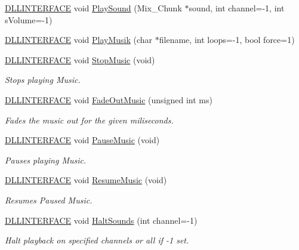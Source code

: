 \begin{DoxyCompactItemize}
\hyperlink{_s_d_l__ep_8h_a38dd54df4631b4daf553096353d7b20b}{D\-L\-L\-I\-N\-T\-E\-R\-F\-A\-C\-E} void \hyperlink{classc_audio_ab3e08ac92b20e0e1c35036db55d90a2d}{Play\-Sound} (Mix\-\_\-\-Chunk $\ast$sound, int channel=-\/1, int s\-Volume=-\/1)
\item 
\hyperlink{_s_d_l__ep_8h_a38dd54df4631b4daf553096353d7b20b}{D\-L\-L\-I\-N\-T\-E\-R\-F\-A\-C\-E} void \hyperlink{classc_audio_a6e9bd7fb6b05c5c4a33d332dbe03fc03}{Play\-Musik} (char $\ast$filename, int loops=-\/1, bool force=1)
\item 
\hyperlink{_s_d_l__ep_8h_a38dd54df4631b4daf553096353d7b20b}{D\-L\-L\-I\-N\-T\-E\-R\-F\-A\-C\-E} void \hyperlink{classc_audio_a9cba1b84f7641a42a317c6fee4738f41}{Stop\-Music} (void)
\begin{DoxyCompactList}\small\item\em Stops playing Music. \end{DoxyCompactList}\item 
\hyperlink{_s_d_l__ep_8h_a38dd54df4631b4daf553096353d7b20b}{D\-L\-L\-I\-N\-T\-E\-R\-F\-A\-C\-E} void \hyperlink{classc_audio_ab0692d495cbdb6a65ae107b1cf6d3cbe}{Fade\-Out\-Music} (unsigned int ms)
\begin{DoxyCompactList}\small\item\em Fades the music out for the given miliseconds. \end{DoxyCompactList}\item 
\hyperlink{_s_d_l__ep_8h_a38dd54df4631b4daf553096353d7b20b}{D\-L\-L\-I\-N\-T\-E\-R\-F\-A\-C\-E} void \hyperlink{classc_audio_a5a71b17343528fedef94f91458c01cd1}{Pause\-Music} (void)
\begin{DoxyCompactList}\small\item\em Pauses playing Music. \end{DoxyCompactList}\item 
\hyperlink{_s_d_l__ep_8h_a38dd54df4631b4daf553096353d7b20b}{D\-L\-L\-I\-N\-T\-E\-R\-F\-A\-C\-E} void \hyperlink{classc_audio_a1c5146cfa9de1b88f3b588bb2e19fe96}{Resume\-Music} (void)
\begin{DoxyCompactList}\small\item\em Resumes Paused Music. \end{DoxyCompactList}\item 
\hyperlink{_s_d_l__ep_8h_a38dd54df4631b4daf553096353d7b20b}{D\-L\-L\-I\-N\-T\-E\-R\-F\-A\-C\-E} void \hyperlink{classc_audio_a01eaf6e54900c525d4921651068df2d9}{Halt\-Sounds} (int channel=-\/1)
\begin{DoxyCompactList}\small\item\em Halt playback on specified channels or all if -\/1 set. \end{DoxyCompactList}\item 

\end{DoxyCompactItemize}
